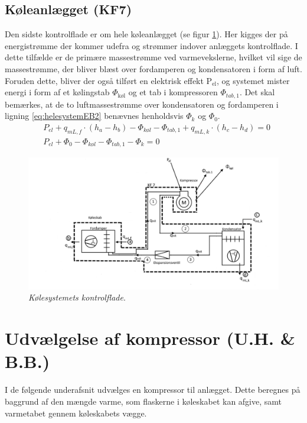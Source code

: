 \documentclass[../Hovedrapport.tex]{subfiles}
\begin{document}
\subsection{Køleanlægget (KF7)}
Den sidste kontrolflade er om hele køleanlægget (se figur \ref{fig:kun_sys}). Her kigges der på energistrømme der kommer udefra og strømmer indover anlæggets kontrolflade. I dette tilfælde er de primære massestrømme ved varmevekslerne, hvilket vil sige de massestrømme, der bliver blæst over fordamperen og kondensatoren i form af luft. Foruden dette, bliver der også tilført en elektrisk effekt $\text{P}_\text{el}$, og systemet mister energi i form af et kølingstab $\Phi_\text{køl}$ og et tab i kompressoren $\Phi_{tab,1}$. Det skal bemærkes, at de to luftmassestrømme over kondensatoren og fordamperen i ligning \ref{eq:helesystemEB2} benævnes henholdsvis $\Phi_k$ og $\Phi_0$.
\begin{align}
\label{eq:helesystemEB}
&P_{el} +q_{mL,f} \cdot (h_a - h_b) - \Phi_{\textit{køl}} - \Phi_{tab,1} + q_{mL,k} \cdot (h_c - h_d) = 0 \\
\label{eq:helesystemEB2}
&P_{el} +\Phi_0 - \Phi_{\textit{køl}} - \Phi_{tab,1} - \Phi_k = 0
\end{align}
\begin{figure}[H] %
	\centering
	\includegraphics[width=1\textwidth]{Billeder/KF_7.png}
	\caption{\textit{Kølesystemets kontrolflade}.}
	\label{fig:kun_sys}
\end{figure}

\section{Udvælgelse af kompressor (U.H. \& B.B.)}
    \label{sec:dim_kompressor}
I de følgende underafsnit udvælges en kompressor til anlægget. Dette beregnes på baggrund af den mængde varme, som flaskerne i køleskabet kan afgive, samt varmetabet gennem køleskabets vægge. 
\end{document}
